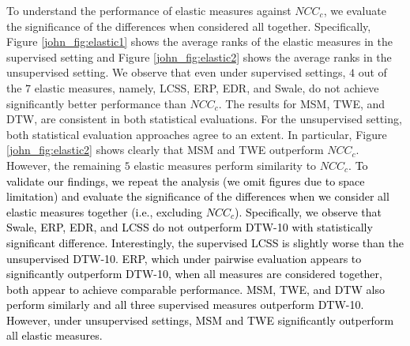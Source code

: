 \documentclass[11pt]{article}
\begin{document}

To understand the performance of elastic measures against $NCC_c$, we evaluate the significance of the differences when considered all together. Specifically, Figure \ref{john_fig:elastic1} shows the average ranks of the elastic measures in the supervised setting and Figure \ref{john_fig:elastic2} shows the average ranks in the unsupervised setting. We observe that even under supervised settings, $4$ out of the $7$ elastic measures, namely, LCSS, ERP, EDR, and Swale, do not achieve significantly better performance than $NCC_c$. The results for MSM, TWE, and DTW, are consistent in both statistical evaluations. For the unsupervised setting, both statistical evaluation approaches agree to an extent. In particular, Figure \ref{john_fig:elastic2} shows clearly that MSM and TWE outperform $NCC_c$. However, the remaining $5$ elastic measures perform similarity to $NCC_c$. \textcolor{black}{To validate our findings, we repeat the analysis (we omit figures due to space limitation) and evaluate the significance of the differences when we consider all elastic measures together (i.e., excluding $NCC_c$). Specifically, we observe that Swale, ERP, EDR, and LCSS do not outperform DTW-10 with statistically significant difference. Interestingly, the supervised LCSS is slightly worse than the unsupervised DTW-10. ERP, which under pairwise evaluation appears to significantly outperform DTW-10, when all measures are considered together, both appear to achieve comparable performance. MSM, TWE, and DTW also perform similarly and all three supervised measures outperform DTW-10. However, under unsupervised settings, MSM and TWE significantly outperform all elastic measures.}
\end{document}
